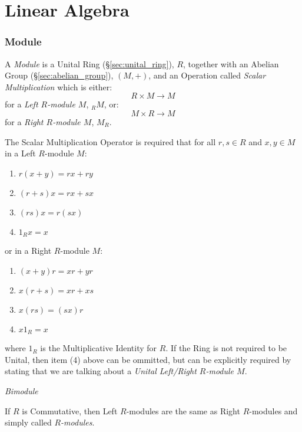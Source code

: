 \part{Linear Algebra}\label{sec:linear_algebra}

\section{Module}\label{sec:module}

A \emph{Module} is a Unital Ring (\S\ref{sec:unital_ring}), $R$,
together with an Abelian Group (\S\ref{sec:abelian_group}), $(M, +)$,
and an Operation called \emph{Scalar Multiplication} which is either:
\[ R \times M \rightarrow M \]
for a \emph{Left $R$-module $M$}, $_R M$, or:
\[ M \times R \rightarrow M \]
for a \emph{Right $R$-module $M$}, $M_R$.

The Scalar Multiplication Operator is required that for all $r,s \in
R$ and $x,y \in M$ in a Left $R$-module $M$:
\begin{enumerate}
    \item $r(x + y) = rx + ry$
    \item $(r + s)x = rx + sx$
    \item $(rs)x = r(sx)$
    \item $1_Rx = x$
\end{enumerate}
or in a Right $R$-module $M$:
\begin{enumerate}
    \item $(x + y)r = xr + yr$
    \item $x(r + s) = xr + xs$
    \item $x(rs) = (sx)r$
    \item $x 1_R = x$
\end{enumerate}
where $1_R$ is the Multiplicative Identity for $R$. If the Ring is not
required to be Unital, then item (4) above can be ommitted, but can be
explicitly required by stating that we are talking about a
\emph{Unital Left/Right $R$-module $M$}.

\emph{Bimodule}

If $R$ is Commutative, then Left $R$-modules are the same as Right
$R$-modules and simply called \emph{$R$-modules}.

